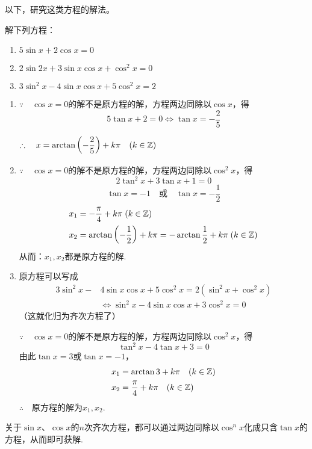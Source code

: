 以下，研究这类方程的解法。


\begin{example}
    解下列方程：
\begin{enumerate}[(1)]
    \item $5\sin x+2\cos x=0$
\item $2\sin2x+3\sin x\cos x+\cos^2x=0$
\item $3\sin^2x-4\sin x\cos x+5\cos^2x=2$
\end{enumerate}
\end{example}

\begin{solution}
\begin{enumerate}[(1)]
    \item $\because\quad \cos x=0$的解不是原方程的解，方程两边同除以$\cos x$，得
 \[ 5\tan x+2=0\Longleftrightarrow \tan x=-\frac{2}{5}\]

$\therefore\quad x=\arctan\left(-\dfrac{2}{5}\right)+k\pi\quad (k\in\mathbb{Z})$

\item $\because\quad \cos x=0$的解不是原方程的解，方程两边同除以$\cos^2 x$，得
\[2\tan^2 x+3\tan x+1=0\]
\[\tan x=-1\quad \text{或}\quad \tan x=-\frac{1}{2}\]
\[\begin{split}
    x_1&=-\dfrac{\pi}{4}+k\pi \; (k\in\mathbb{Z})\\
    x_2&=\arctan\left(-\dfrac{1}{2}\right)+k\pi =-\arctan \dfrac{1}{2}+k\pi \; (k\in\mathbb{Z})\\
\end{split}\]
从而：$x_1,x_2$都是原方程的解.

\item 原方程可以写成
\[\begin{split}
    3\sin^2 x-&4\sin x\cos x+5\cos^2 x=2(\sin^2x+\cos^2 x)\\
    &\Longleftrightarrow \sin^2x-4\sin x\cos x+3\cos^2 x=0
\end{split} \]
（这就化归为齐次方程了）

$\because\quad \cos x=0$的解不是原方程的解，方程两边同除以$\cos^2 x$，得
\[\tan^2 x-4\tan x+3=0\]
由此$\tan x=3$或$\tan x=-1$，
\[\begin{split}
    x_1&=\arctan3+k\pi \quad  (k\in\mathbb{Z})\\
    x_2&=\dfrac{\pi}{4}+k\pi \quad  (k\in\mathbb{Z})
\end{split}\]
$\therefore\quad$原方程的解为$x_1,x_2$.
\end{enumerate}    
\end{solution}

\begin{remark}
    关于$\sin x$、$\cos x$的$n$次齐次方程，都可以通过两边同除以$\cos^n x$化成只含$\tan x$的方程，从而即可获解.
\end{remark}

